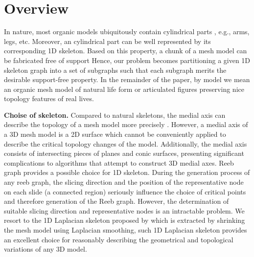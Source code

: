 \section{Overview}

In nature, most organic models ubiquitously contain cylindrical parts \cite{Zhou:2015:GCD}, e.g., arms, legs, etc. Moreover, an cylindrical part can be well represented by its corresponding 1{D} skeleton. Based on this property, a chunk of a mesh model can be fabricated free of support  Hence, our problem becomes partitioning a given 1{D} skeleton graph into a set of subgraphs such that each subgraph merits the desirable support-free property. In the remainder of the paper, by model we mean an organic mesh model of natural life form or articulated figures preserving nice topology features of real lives.

\textbf{Choise of skeleton.} Compared to natural skeletons, the medial axis can describe the topology of a mesh model more precisely \cite{ZhangXWYTW15}. However, a medial axis of a 3D mesh model is a 2D surface which cannot be conveniently applied to describe the critical topology changes of the model. Additionally, the medial axis consists of intersecting pieces of planes and conic surfaces, presenting significant complications to algorithms that attempt to construct 3D medial axes.
Reeb graph provides a possible choice for 1D skeleton. During the generation process of any reeb graph, the slicing direction and the position of the representative node on each slide (a connected region) seriously influence the choice of critical points and therefore generation of the Reeb graph. However, the determination of suitable slicing direction and representative nodes is an intractable problem. We resort to the 1D Laplacian skeleton proposed by \cite{AuTCCL08} which is extracted by shrinking the mesh model using Laplacian smoothing, such 1D Laplacian skeleton provides an excellent choice for reasonably describing the geometrical and topological variations of any 3{D} model.






